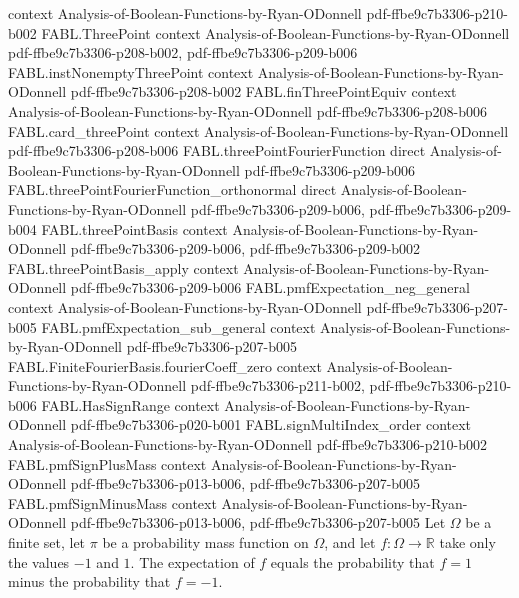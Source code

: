 \begin{theorem}
  {context}
  {Analysis-of-Boolean-Functions-by-Ryan-ODonnell}
  {pdf-ffbe9c7b3306-p210-b002}
\proofstep
  {FABL.ThreePoint}
  {context}
  {Analysis-of-Boolean-Functions-by-Ryan-ODonnell}
  {pdf-ffbe9c7b3306-p208-b002,
    pdf-ffbe9c7b3306-p209-b006}
\proofstep
  {FABL.instNonemptyThreePoint}
  {context}
  {Analysis-of-Boolean-Functions-by-Ryan-ODonnell}
  {pdf-ffbe9c7b3306-p208-b002}
\proofstep
  {FABL.finThreePointEquiv}
  {context}
  {Analysis-of-Boolean-Functions-by-Ryan-ODonnell}
  {pdf-ffbe9c7b3306-p208-b006}
\proofstep
  {FABL.card_threePoint}
  {context}
  {Analysis-of-Boolean-Functions-by-Ryan-ODonnell}
  {pdf-ffbe9c7b3306-p208-b006}
\proofstep
  {FABL.threePointFourierFunction}
  {direct}
  {Analysis-of-Boolean-Functions-by-Ryan-ODonnell}
  {pdf-ffbe9c7b3306-p209-b006}
\proofstep
  {FABL.threePointFourierFunction_orthonormal}
  {direct}
  {Analysis-of-Boolean-Functions-by-Ryan-ODonnell}
  {pdf-ffbe9c7b3306-p209-b006,
    pdf-ffbe9c7b3306-p209-b004}
\proofstep
  {FABL.threePointBasis}
  {context}
  {Analysis-of-Boolean-Functions-by-Ryan-ODonnell}
  {pdf-ffbe9c7b3306-p209-b006,
    pdf-ffbe9c7b3306-p209-b002}
\proofstep
  {FABL.threePointBasis_apply}
  {context}
  {Analysis-of-Boolean-Functions-by-Ryan-ODonnell}
  {pdf-ffbe9c7b3306-p209-b006}
\proofstep
  {FABL.pmfExpectation_neg_general}
  {context}
  {Analysis-of-Boolean-Functions-by-Ryan-ODonnell}
  {pdf-ffbe9c7b3306-p207-b005}
\proofstep
  {FABL.pmfExpectation_sub_general}
  {context}
  {Analysis-of-Boolean-Functions-by-Ryan-ODonnell}
  {pdf-ffbe9c7b3306-p207-b005}
\proofstep
  {FABL.FiniteFourierBasis.fourierCoeff_zero}
  {context}
  {Analysis-of-Boolean-Functions-by-Ryan-ODonnell}
  {pdf-ffbe9c7b3306-p211-b002,
    pdf-ffbe9c7b3306-p210-b006}
\proofstep
  {FABL.HasSignRange}
  {context}
  {Analysis-of-Boolean-Functions-by-Ryan-ODonnell}
  {pdf-ffbe9c7b3306-p020-b001}
\proofstep
  {FABL.signMultiIndex_order}
  {context}
  {Analysis-of-Boolean-Functions-by-Ryan-ODonnell}
  {pdf-ffbe9c7b3306-p210-b002}
\proofstep
  {FABL.pmfSignPlusMass}
  {context}
  {Analysis-of-Boolean-Functions-by-Ryan-ODonnell}
  {pdf-ffbe9c7b3306-p013-b006,
    pdf-ffbe9c7b3306-p207-b005}
\proofstep
  {FABL.pmfSignMinusMass}
  {context}
  {Analysis-of-Boolean-Functions-by-Ryan-ODonnell}
  {pdf-ffbe9c7b3306-p013-b006,
    pdf-ffbe9c7b3306-p207-b005}
Let $\Omega$ be a finite set, let $\pi$ be a probability mass function on $\Omega$, and
let $f:\Omega\to\mathbb{R}$ take only the values $-1$ and $1$. The expectation of $f$
equals the probability that $f=1$ minus the probability that $f=-1$.
\end{theorem}

